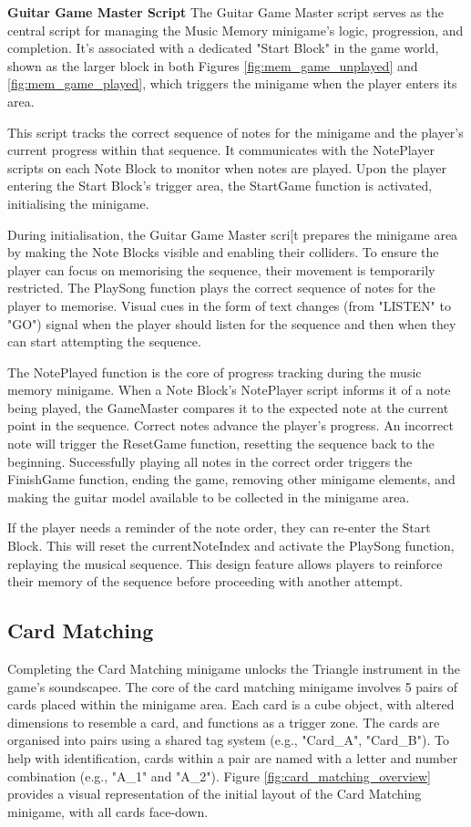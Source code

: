 \documentclass{l4proj}
\begin{document}
\textbf{Guitar Game Master Script} \newline
The Guitar Game Master script serves as the central script for managing the Music Memory minigame's logic, progression, and completion. It's associated with a dedicated "Start Block" in the game world, shown as the larger block in both Figures \ref{fig:mem_game_unplayed} and  \ref{fig:mem_game_played}, which triggers the minigame when the player enters its area.

This script tracks the correct sequence of notes for the minigame and the player's current progress within that sequence. It communicates with the NotePlayer scripts on each Note Block to monitor when notes are played. Upon the player entering the Start Block's trigger area, the StartGame function is activated, initialising the minigame.

During initialisation, the Guitar Game Master scri[t prepares the minigame area by making the Note Blocks visible and enabling their colliders. To ensure the player can focus on memorising the sequence, their movement is temporarily restricted. The PlaySong function plays the correct sequence of notes for the player to memorise. Visual cues in the form of text changes (from "LISTEN" to "GO") signal when the player should listen for the sequence and then when they can start attempting the sequence.

The NotePlayed function is the core of progress tracking during the music memory minigame. When a Note Block's NotePlayer script informs it of a note being played, the GameMaster compares it to the expected note at the current point in the sequence. Correct notes advance the player's progress. An incorrect note will trigger the ResetGame function, resetting the sequence back to the beginning. Successfully playing all notes in the correct order triggers the FinishGame function, ending the game, removing other minigame elements, and making the guitar model available to be collected in the minigame area.

If the player needs a reminder of the note order, they can re-enter the Start Block. This will reset the currentNoteIndex and activate the PlaySong function, replaying the musical sequence. This design feature allows players to reinforce their memory of the sequence before proceeding with another attempt.


\subsection{Card Matching}
Completing the Card Matching minigame unlocks the Triangle instrument in the game's soundscapee. The core of the card matching minigame involves 5 pairs of cards placed within the minigame area. Each card is a cube object, with altered dimensions to resemble a card, and functions as a trigger zone.  The cards are organised into pairs using a shared tag system (e.g., "Card\_A", "Card\_B"). To help with identification, cards within a pair are named with a letter and number combination (e.g., "A\_1" and "A\_2"). Figure \ref{fig:card_matching_overview} provides a visual representation of the initial layout of the Card Matching minigame, with all cards face-down.
\end{document}
